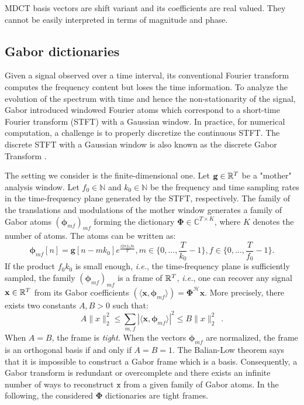 MDCT basis vectors are shift variant and its coefficients are real valued. They cannot be easily interpreted in terms of magnitude and phase.

\subsection{Gabor dictionaries}
Given a signal observed over a time interval, its conventional Fourier transform computes the frequency content but loses the time information. To analyze the evolution of the spectrum with time and hence the non-stationarity of the signal, Gabor introduced windowed Fourier atoms which correspond to a short-time Fourier transform (STFT) with a Gaussian window. In practice, for numerical computation, a challenge is to properly discretize the continuous STFT. The discrete STFT with a Gaussian window is also known as the discrete Gabor Transform \cite{gabor1946theory}.

The setting we consider is the finite-dimensional one. Let $\mathbf{g}\in \mathbb{R}^{T}$ be a "mother" analysis window. Let $f_0\in \mathbb{N}$ and $k_0\in \mathbb{N}$ be the frequency and time sampling rates in the time-frequency plane generated by the STFT, respectively. The family of the translations and modulations of the mother window generates a family of Gabor atoms $(\mathbf{\phi}_{mf})_{mf}$ forming the dictionary $\mathbf{\Phi}\in \mathbb{C}^{T\times K}$, where $K$ denotes the number of atoms. The atoms can be written as:
\begin{equation} \label{eq_gabor_atoms}
	\mathbf{\phi}_{mf}[n] = \mathbf{g}[n-mk_0]e^{\frac{i2\pi f_0 fn}{T}}, m\in \{0,\dots ,\frac{T}{k_0}-1\}, f\in \{0,\dots ,\frac{T}{f_0}-1\}.
\end{equation}
If the product $f_0k_0$ is small enough, \textit{i.e.}, the time-frequency plane is sufficiently sampled, the family $(\mathbf{\phi}_{mf})_{mf}$ is a frame of $\mathbb{R}^T$, \textit{i.e.}, one can recover any signal $\mathbf{x}\in \mathbb{R}^T$ from its Gabor coefficients $(\langle \mathbf{x}, \mathbf{\phi}_{mf}\rangle)=\mathbf{\Phi}^{\mathcal{H}}\mathbf{x}$. More precisely, there exists two constants $A, B > 0$ such that:
\begin{equation} \label{eq_frame}
	A\|x\|_2^2 \leq \sum_{m,f}|\langle \mathbf{x}, \mathbf{\phi}_{mf}\rangle|^2\leq B\|x\|_2^2 \enspace .
\end{equation}
When $A=B$, the frame is \textit{tight}. When the vectors $\mathbf{\phi}_{mf}$ are normalized, the frame is an orthogonal basis if and only if $A=B=1$. The Balian-Low theorem says that it is impossible to construct a Gabor frame which is a basis. Consequently, a Gabor transform is redundant or overcomplete and there exists an infinite number of ways to reconstruct $\mathtt{x}$ from a given family of Gabor atoms. In the following, the considered $\mathbf{\Phi}$ dictionaries are tight frames.


